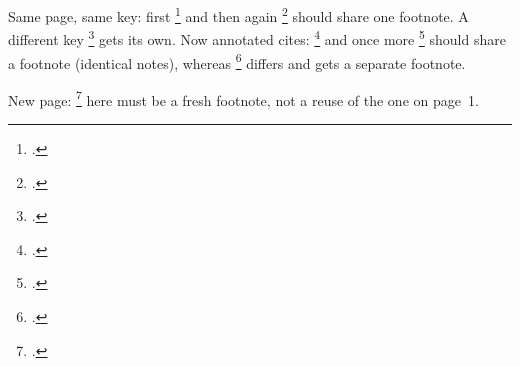 \documentclass{article}
\begin{document}
Same page, same key: first \footcite{A} and then again \footcite{A} should share
one footnote. A different key \footcite{B} gets its own. Now annotated cites:
\footcite[see][p.~5]{A} and once more \footcite[see][p.~5]{A} should share a
footnote (identical notes), whereas \footcite[cf.][p.~7]{A} differs and gets a
separate footnote.

\newpage

New page: \footcite{A} here must be a fresh footnote, not a reuse of the one on
page~1.
\end{document}
